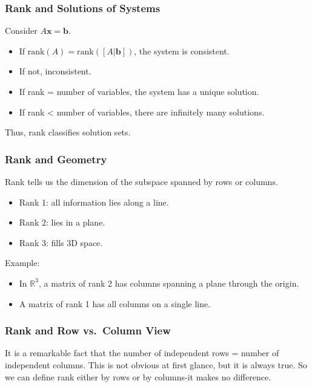 \documentclass[
  letterpaper,
  DIV=11,
  numbers=noendperiod]{scrreprt}
\providecommand{\tightlist}{%
  \setlength{\itemsep}{0pt}\setlength{\parskip}{0pt}}
\begin{document}
\subsubsection{Rank and Solutions of
Systems}\label{rank-and-solutions-of-systems}

Consider \(A\mathbf{x} = \mathbf{b}\).

\begin{itemize}
\tightlist
\item
  If \(\text{rank}(A) = \text{rank}([A|\mathbf{b}])\), the system is
  consistent.
\item
  If not, inconsistent.
\item
  If rank = number of variables, the system has a unique solution.
\item
  If rank \textless{} number of variables, there are infinitely many
  solutions.
\end{itemize}

Thus, rank classifies solution sets.

\subsubsection{Rank and Geometry}\label{rank-and-geometry}

Rank tells us the dimension of the subspace spanned by rows or columns.

\begin{itemize}
\tightlist
\item
  Rank 1: all information lies along a line.
\item
  Rank 2: lies in a plane.
\item
  Rank 3: fills 3D space.
\end{itemize}

Example:

\begin{itemize}
\tightlist
\item
  In \(\mathbb{R}^3\), a matrix of rank 2 has columns spanning a plane
  through the origin.
\item
  A matrix of rank 1 has all columns on a single line.
\end{itemize}

\subsubsection{Rank and Row vs.~Column
View}\label{rank-and-row-vs.-column-view}

It is a remarkable fact that the number of independent rows = number of
independent columns. This is not obvious at first glance, but it is
always true. So we can define rank either by rows or by columns-it makes
no difference.
\end{document}
